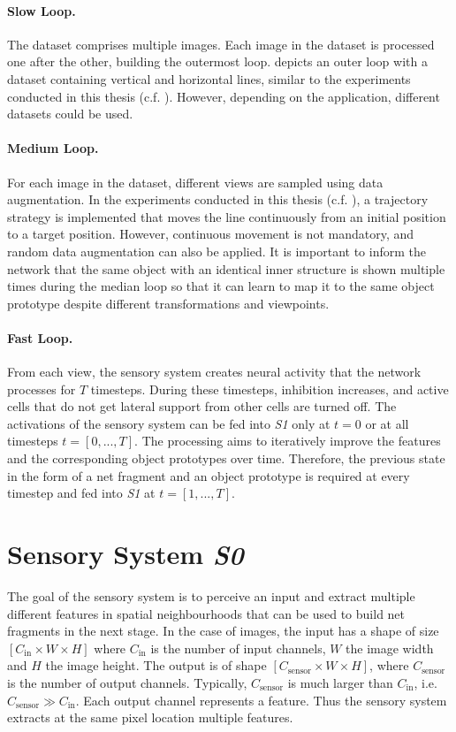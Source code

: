 \paragraph{Slow Loop.} The dataset comprises multiple images. Each image in the dataset is processed one after the other, building the outermost loop.  depicts an outer loop with a dataset containing vertical and horizontal lines, similar to the experiments conducted in this thesis (c.f. ). However, depending on the application, different datasets could be used.

\paragraph{Medium Loop.} For each image in the dataset, different views are sampled using data augmentation. In the experiments conducted in this thesis (c.f. ), a trajectory strategy is implemented that moves the line continuously from an initial position to a target position.
However, continuous movement is not mandatory, and random data augmentation can also be applied. It is important to inform the network that the same object with an identical inner structure is shown multiple times during the median loop so that it can learn to map it to the same object prototype despite different transformations and viewpoints.

\paragraph{Fast Loop.} From each view, the sensory system creates neural activity that the network processes for $T$ timesteps. During these timesteps, inhibition increases, and active cells that do not get lateral support from other cells are turned off. 
The activations of the sensory system can be fed into \emph{S1} only at $t=0$ or at all timesteps $t=[0, ..., T]$. The processing aims to iteratively improve the features and the corresponding object prototypes over time. Therefore, the previous state in the form of a net fragment and an object prototype is required at every timestep and fed into \emph{S1} at $t=[1, ..., T]$.


\section{Sensory System \emph{S0}}
The goal of the sensory system is to perceive an input and extract multiple different features in spatial neighbourhoods that can be used to build net fragments in the next stage.
In the case of images, the input has a shape of size $[C_{\text{in}} \times W \times H]$ where $C_{\text{in}}$ is the number of input channels, $W$ the image width and $H$ the image height.
The output is of shape $[C_{\text{sensor}} \times W \times H]$, where $C_{\text{sensor}}$ is the number of output channels. Typically, $C_{\text{sensor}}$ is much larger than $C_{\text{in}}$, i.e. $C_{\text{sensor}} \gg C_{\text{in}}$.
Each output channel represents a feature. Thus the sensory system extracts at the same pixel location multiple features.


